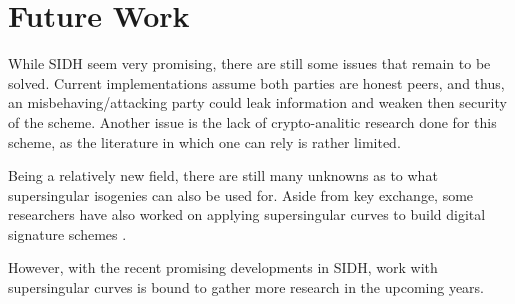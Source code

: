 \documentclass[10pt,twocolumn]{article} %
\begin{document}
\section{Future Work}
While SIDH seem very promising, there are still some issues that remain to be solved. Current implementations assume both parties are honest peers, and thus, an misbehaving/attacking party could leak information and weaken then security of the scheme. Another issue is the lack of crypto-analitic research done for this scheme, as the literature in which one can rely is rather limited.
\par Being a relatively new field, there are still many unknowns as to what supersingular isogenies can also be used for. Aside from key exchange, some researchers have also worked on applying supersingular curves to build digital signature schemes \cite{jao2014isogeny,sun2014toward}. 
\par However, with the recent promising developments in SIDH, work with supersingular curves is bound to gather more research in the upcoming years. 






\end{document}
